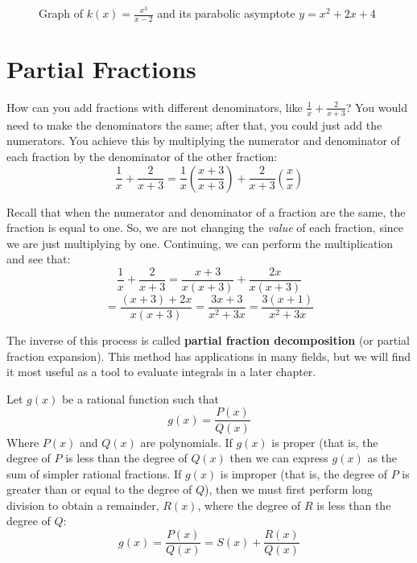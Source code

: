 \begin{figure}[H]
  \centering
  \caption{Graph of \( k(x) = \frac{x^3}{x - 2} \) and its parabolic asymptote \( y = x^2 + 2x + 4 \)}
\end{figure}


\section{Partial Fractions}
How can you add fractions with different denominators, like $\frac{1}{x} + 
\frac{2}{x + 3}$? You would need to make the denominators the same; after that, you 
could just add the numerators. You achieve this by multiplying the numerator 
and denominator of each fraction by the denominator of the other fraction:
$$\frac{1}{x} + \frac{2}{x + 3} = \frac{1}{x} \left( \frac{x + 3}{x + 3} 
\right) + \frac{2}{x + 3} \left( \frac{x}{x} \right)$$

Recall that when the numerator and denominator of a fraction are the same, the 
fraction is equal to one. So, we are not changing the \textit{value} of each 
fraction, since we are just multiplying by one. Continuing, we can perform the 
multiplication and see that:
$$\frac{1}{x} + \frac{2}{x + 3} = \frac{x + 3}{x(x + 3)} + \frac{2x}{x(x + 3)}$$
$$= \frac{(x + 3) + 2x}{x(x + 3)} = \frac{3x + 3}{x^2 + 3x} = \frac{3(x + 1)}{x
^2 + 3x}$$

The inverse of this process is called \textbf{partial fraction decomposition} 
(or partial fraction expansion). This 
method has applications in many fields, but we will find it most useful as a 
tool to evaluate integrals in a later chapter. 


Let $g(x)$ be a rational function such that 
$$g(x) = \frac{P(x)}{Q(x)}$$
Where $P(x)$ and $Q(x)$ are polynomials. If $g(x)$ is proper (that is, the 
degree of $P$ is less than the degree of $Q(x)$ then we can express $g(x)$ as 
the sum of simpler rational fractions. If $g(x)$ is improper (that is, the 
degree of $P$ is greater than or equal to the degree of $Q$), then we must 
first perform long division to obtain a remainder, $R(x)$, where the degree 
of $R$ is less than the degree of $Q$:
$$g(x) = \frac{P(x)}{Q(x)} = S(x) + \frac{R(x)}{Q(x)}$$

